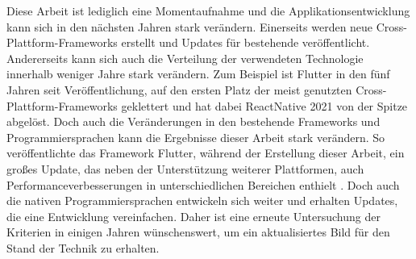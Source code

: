 Diese Arbeit ist lediglich eine Momentaufnahme und die Applikationsentwicklung kann sich in den nächsten Jahren stark verändern. Einerseits werden neue Cross-Plattform-Frameworks erstellt und Updates für bestehende veröffentlicht. Andererseits kann sich auch die Verteilung der verwendeten Technologie innerhalb weniger Jahre stark verändern. Zum Beispiel ist Flutter in den fünf Jahren seit Veröffentlichung, auf den ersten Platz der meist genutzten Cross-Plattform-Frameworks geklettert und hat dabei ReactNative 2021 von der Spitze abgelöst. Doch auch die Veränderungen in den bestehende Frameworks und Programmiersprachen kann die Ergebnisse dieser Arbeit stark verändern. So veröffentlichte das Framework Flutter, während der Erstellung dieser Arbeit, ein großes Update, das neben der Unterstützung weiterer Plattformen, auch Performanceverbesserungen in unterschiedlichen Bereichen enthielt \cite{flutter3}. Doch auch die nativen Programmiersprachen entwickeln sich weiter und erhalten Updates, die eine Entwicklung vereinfachen. Daher ist eine erneute Untersuchung der Kriterien in einigen Jahren wünschenswert, um ein aktualisiertes Bild für den Stand der Technik zu erhalten.
